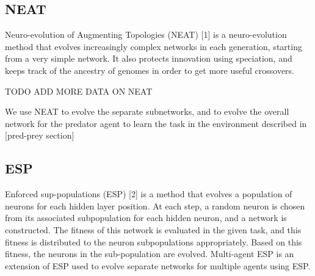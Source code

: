 \subsection{NEAT}
\label{neat}
Neuro-evolution of Augmenting Topologies (NEAT) [1] is a neuro-evolution method that evolves increasingly complex networks in each generation, starting from a very simple network. It also protects innovation using speciation, and keeps track of the ancestry of genomes in order to get more useful crossovers.
   
TODO ADD MORE DATA ON NEAT 

We use NEAT to evolve the separate subnetworks, and to evolve the overall network for the predator agent to learn the task in the environment described in [pred-prey section] 

\subsection{ESP}
\label{esp}
Enforced sup-populations (ESP) [2] is a method that evolves a population of neurons for each hidden layer position. At each step, a random neuron is chosen from its associated subpopulation for each hidden neuron, and a network is constructed. The fitness of this network is evaluated in the given task, and this fitness is distributed to the neuron subpopulations appropriately. Based on this fitness, the neurons in the sub-population are evolved.
Multi-agent ESP is an extension of ESP used to evolve separate networks for multiple agents using ESP. 

